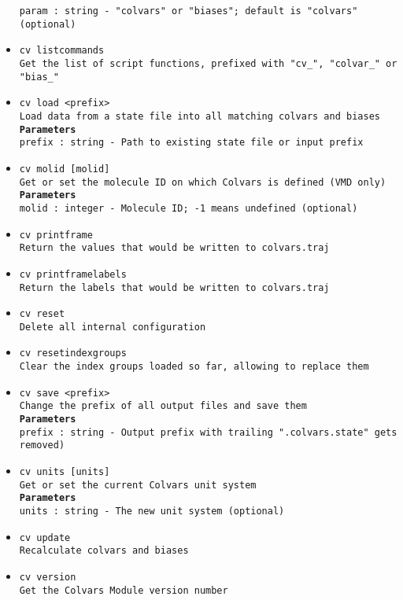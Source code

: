 \begin{itemize}
\texttt{param : string - "colvars" or "biases"; default is "colvars" (optional)}
\item \texttt{cv listcommands}
\\
\texttt{Get the list of script functions, prefixed with "cv\_", "colvar\_" or "bias\_"}
\item \texttt{cv load <prefix>}
\\
\texttt{Load data from a state file into all matching colvars and biases}
\\
\texttt{\textbf{Parameters}}
\\
\texttt{prefix : string - Path to existing state file or input prefix}
\item \texttt{cv molid [molid]}
\\
\texttt{Get or set the molecule ID on which Colvars is defined (VMD only)}
\\
\texttt{\textbf{Parameters}}
\\
\texttt{molid : integer - Molecule ID; -1 means undefined (optional)}
\item \texttt{cv printframe}
\\
\texttt{Return the values that would be written to colvars.traj}
\item \texttt{cv printframelabels}
\\
\texttt{Return the labels that would be written to colvars.traj}
\item \texttt{cv reset}
\\
\texttt{Delete all internal configuration}
\item \texttt{cv resetindexgroups}
\\
\texttt{Clear the index groups loaded so far, allowing to replace them}
\item \texttt{cv save <prefix>}
\\
\texttt{Change the prefix of all output files and save them}
\\
\texttt{\textbf{Parameters}}
\\
\texttt{prefix : string - Output prefix with trailing ".colvars.state" gets removed)}
\item \texttt{cv units [units]}
\\
\texttt{Get or set the current Colvars unit system}
\\
\texttt{\textbf{Parameters}}
\\
\texttt{units : string - The new unit system (optional)}
\item \texttt{cv update}
\\
\texttt{Recalculate colvars and biases}
\item \texttt{cv version}
\\
\texttt{Get the Colvars Module version number}
\end{itemize}

